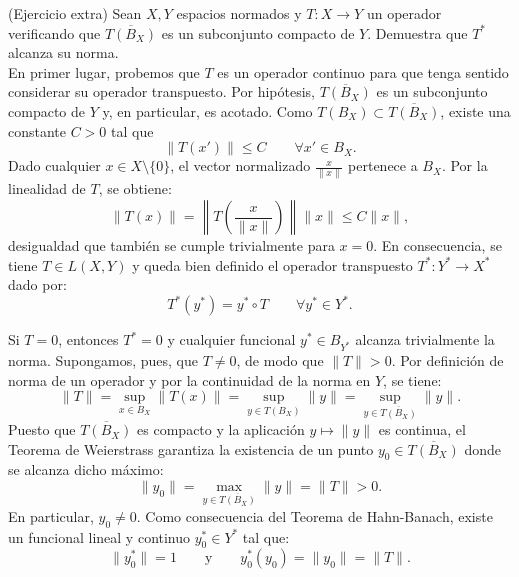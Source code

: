 \documentclass[12pt]{article}
\begin{document}
    \begin{ejercicio}
        (Ejercicio extra)\newline
        Sean $X,Y$ espacios normados y $T:X\to Y$ un operador verificando que $\overline{T(B_X)}$ es un subconjunto compacto de $Y$. Demuestra que $T^\ast$ alcanza su norma.\\

        En primer lugar, probemos que $T$ es un operador continuo para que tenga sentido considerar su operador transpuesto. Por hipótesis, $\overline{T(B_X)}$ es un subconjunto compacto de $Y$ y, en particular, es acotado. Como $T(B_X) \subset \overline{T(B_X)}$, existe una constante $C > 0$ tal que
        \begin{equation*}
            \|T(x')\| \leq C \qquad \forall x' \in B_X.
        \end{equation*}
        Dado cualquier $x \in X \setminus \{0\}$, el vector normalizado $\frac{x}{\|x\|}$ pertenece a $B_X$. Por la linealidad de $T$, se obtiene:
        \begin{equation*}
            \|T(x)\| = \left\| T\left(\frac{x}{\|x\|}\right) \right\| \|x\| \leq C \|x\|,
        \end{equation*}
        desigualdad que también se cumple trivialmente para $x = 0$. En consecuencia, se tiene $T \in L(X, Y)$ y queda bien definido el operador transpuesto $T^\ast : Y^\ast \to X^\ast$ dado por:
        \begin{equation*}
            T^\ast(y^\ast) = y^\ast \circ T \qquad \forall y^\ast \in Y^\ast.
        \end{equation*}

        Si $T = 0$, entonces $T^\ast = 0$ y cualquier funcional $y^\ast \in B_{Y^\ast}$ alcanza trivialmente la norma. Supongamos, pues, que $T \neq 0$, de modo que $\|T\| > 0$. Por definición de norma de un operador y por la continuidad de la norma en $Y$, se tiene:
        \begin{equation*}
            \|T\| = \sup_{x \in B_X} \|T(x)\| = \sup_{y \in T(B_X)} \|y\| = \sup_{y \in \overline{T(B_X)}} \|y\|.
        \end{equation*}
        Puesto que $\overline{T(B_X)}$ es compacto y la aplicación $y \mapsto \|y\|$ es continua, el Teorema de Weierstrass garantiza la existencia de un punto $y_0 \in \overline{T(B_X)}$ donde se alcanza dicho máximo:
        \begin{equation*}
            \|y_0\| = \max_{y \in \overline{T(B_X)}} \|y\| = \|T\| > 0.
        \end{equation*}
        En particular, $y_0 \neq 0$. Como consecuencia del Teorema de Hahn-Banach, existe un funcional lineal y continuo $y_0^\ast \in Y^\ast$ tal que:
        \begin{equation*}
            \|y_0^\ast\| = 1 \qquad \text{y} \qquad y_0^\ast(y_0) = \|y_0\| = \|T\|.
        \end{equation*}


\end{ejercicio}
\end{document}
